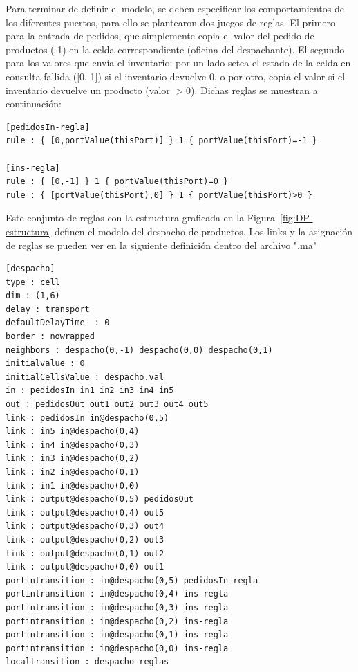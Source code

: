 \documentclass[10pt]{article}
\begin{document}
Para terminar de definir el modelo, se deben especificar los comportamientos de los diferentes puertos, para ello se plantearon dos juegos de reglas. El primero para la entrada de pedidos, que simplemente copia el valor del pedido de productos (-1) en la celda correspondiente (oficina del despachante). El segundo para los valores que envía el inventario: por un lado  setea el estado de la celda en consulta fallida ([0,-1]) si el inventario devuelve 0, o por otro, copia el valor si el inventario devuelve un producto (valor $>0$). Dichas reglas se muestran a continuación:

\begin{minipage}{1\textwidth}
	\centering
	\begin{lstlisting}
[pedidosIn-regla]
rule : { [0,portValue(thisPort)] } 1 { portValue(thisPort)=-1 }

[ins-regla]
rule : { [0,-1] } 1 { portValue(thisPort)=0 }
rule : { [portValue(thisPort),0] } 1 { portValue(thisPort)>0 }
	\end{lstlisting}
\end{minipage}

Este conjunto de reglas con la estructura graficada en la Figura~\ref{fig:DP-estructura} definen el modelo del despacho de productos. Los links y la asignación de reglas se pueden ver en la siguiente definición dentro del archivo ".ma"

\begin{minipage}{1\textwidth}
	\centering
	\begin{lstlisting}
[despacho]
type : cell
dim : (1,6)
delay : transport
defaultDelayTime  : 0
border : nowrapped
neighbors : despacho(0,-1) despacho(0,0) despacho(0,1)
initialvalue : 0
initialCellsValue : despacho.val
in : pedidosIn in1 in2 in3 in4 in5
out : pedidosOut out1 out2 out3 out4 out5
link : pedidosIn in@despacho(0,5)
link : in5 in@despacho(0,4)
link : in4 in@despacho(0,3)
link : in3 in@despacho(0,2)
link : in2 in@despacho(0,1)
link : in1 in@despacho(0,0)
link : output@despacho(0,5) pedidosOut
link : output@despacho(0,4) out5
link : output@despacho(0,3) out4
link : output@despacho(0,2) out3
link : output@despacho(0,1) out2
link : output@despacho(0,0) out1
portintransition : in@despacho(0,5) pedidosIn-regla
portintransition : in@despacho(0,4) ins-regla
portintransition : in@despacho(0,3) ins-regla
portintransition : in@despacho(0,2) ins-regla
portintransition : in@despacho(0,1) ins-regla
portintransition : in@despacho(0,0) ins-regla
localtransition : despacho-reglas
\end{lstlisting}
\end{minipage}
\end{document}
